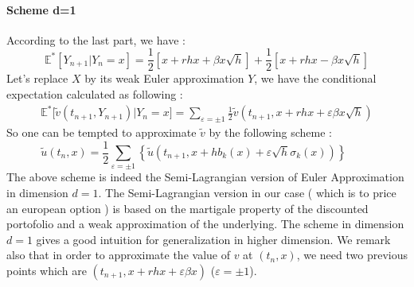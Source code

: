 \documentclass[a4paper,10pt]{article}
\begin{document}
\paragraph{Scheme d=1 }
According to the last part, we have :
\begin{equation}
\mathbb{E}^*[Y_{n+1}|Y_n=x] =\frac{1}{2}\left\lbrack x+rhx+\beta x
\sqrt{h}\right\rbrack +\frac{1}{2}\left\lbrack x+rhx-\beta x \sqrt{h} 
\right\rbrack
\end{equation}
Let's replace $X$ by its weak Euler approximation $Y$, we have the conditional expectation calculated as following : 
\begin{equation}
\begin{split}
\mathbb{E}^*\lbrack\tilde{v}(t_{n+1},Y_{n+1})|Y_{n}=x\rbrack 
= \sum_{\varepsilon=\pm 1}\frac{1}{2}\tilde{v}(t_{n+1},x+rhx+\varepsilon\beta x \sqrt{h})
\end{split}
\end{equation}
So one can be tempted to approximate $\tilde{v}$ by the following scheme :
\begin{equation}
\tilde{u}(t_{n},x)= \frac{1}{2} \sum_{\varepsilon = \pm1} 
\left\{
\tilde{u}\left(t_{n+1},x + hb_k(x) + \varepsilon \sqrt{h} \sigma_k (x) \right)
\right\}
\hspace{1cm}
\end{equation}
The above scheme is indeed the Semi-Lagrangian version of Euler Approximation in dimension $d=1$. The Semi-Lagrangian version in our case ( which is to price an european option ) is based on the martigale property of the discounted portofolio and a weak approximation of the underlying. The scheme in dimension $d=1$ gives a good intuition for generalization in higher dimension. We remark also that in order to approximate the value of $v$ at $(t_n,x)$, we need two previous points which are $(t_{n+1},x+rhx+\varepsilon\beta x)$ ($\varepsilon=\pm1$).
\end{document}
